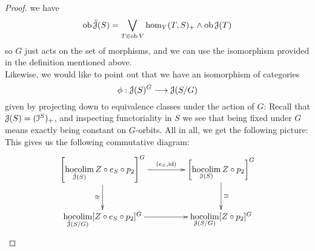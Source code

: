 \begin{lem}
\begin{proof}
      we have
      \begin{displaymath}
        \operatorname{ob} \tilde{\mathcal{J}}(S) = \bigvee_{T \in \operatorname{ob} V} \operatorname{hom}_V (T,S)_+ 
          \wedge \operatorname{ob} \mathcal{J}(T)
      \end{displaymath}
      so $G$ just acts on the set of morphisms, and we can use the isomorphism
      provided in the definition mentioned above.\\
      Likewise, we would like to point out that we have an isomorphism of
      categories
      \begin{displaymath}
        \phi: \mathcal{J}(S)^G \longrightarrow \mathcal{J}(S/G)
      \end{displaymath}
      given by projecting down to equivalence classes under the action of $G$:
      Recall that $\mathcal{J}(S) = (\mathcal{I}^S)_+$, and inspecting functoriality in $S$ we
      see that being fixed under $G$ means exactly being constant on $G$-orbits.
      All in all, we get the following picture:
      This gives us the following commutative diagram:
      \begin{displaymath}
        \xymatrix@C+2em{
          \left[ \hocolim\limits_{\tilde{\cJ}(S)} Z \circ e_S \circ p_2
            \right]^G
            \ar[r]^-{(e_S, \id)}
            \ar[d]_-{\cong}
          &
          \left[\hocolim\limits_{\cJ(S)} Z \circ p_2 \right]^G
            \ar[d]^-{\cong}
          \\
          \hocolim\limits_{\tilde{\cJ}(S/G)} [Z \circ e_S \circ p_2]^G
            \ar[r]
          &
          \hocolim\limits_{\cJ(S/G)} [Z \circ p_2 ]^G
        }
      \end{displaymath}
    \end{proof}
  \end{lem}
